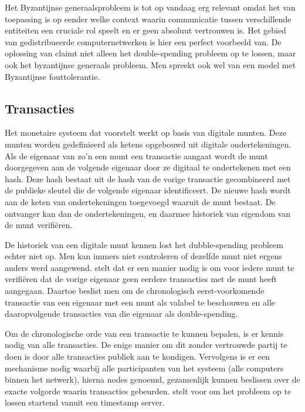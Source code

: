 			Het Byzantijnse generaalsprobleem is tot op vandaag erg relevant omdat het van toepassing is op eender welke context waarin communicatie tussen verschillende entiteiten een cruciale rol speelt en er geen absoluut vertrouwen is. Het gebied van gedistribueerde computernetwerken is hier een perfect voorbeeld van. De oplossing van \textcite{Nakamoto2008} claimt niet alleen het double-spending probleem op te lossen, maar ook het byzantijnse generaals probleem. Men spreekt ook wel van een model met Byzantijnse fouttolerantie.
			
	\subsection{Transacties}
	Het monetaire systeem dat \textcite{Nakamoto2008} voorstelt werkt op basis van digitale munten. Deze munten worden gedefinieerd als ketens opgebouwd uit digitale ondertekeningen. Als de eigenaar van zo’n een munt een transactie aangaat wordt de munt doorgegeven aan de volgende eigenaar door ze digitaal te ondertekenen met een hash. Deze hash bestaat uit de hash van de vorige transactie gecombineerd met de publieke sleutel die de volgende eigenaar identificeert. De nieuwe hash wordt aan de keten van ondertekeningen toegevoegd waaruit de munt bestaat. De ontvanger kan dan de ondertekeningen, en daarmee historiek van eigendom van de munt verifiëren. 
			
	De historiek van een digitale munt kennen lost het dubble-spending probleem echter niet op. Men kan immers niet controleren of dezelfde munt niet ergens anders werd aangewend. \textcite{Nakamoto2008} stelt dat er een manier nodig is om voor iedere munt te verifiëren dat de vorige eigenaar geen eerdere transacties met de munt heeft aangegaan. Daartoe beslist men om de chronologisch eerst-voorkomende transactie van een eigenaar met een munt als valabel te beschouwen en alle daaropvolgende transacties van die eigenaar als double-spending. 
			
	Om de chronologische orde van een transactie te kunnen bepalen, is er kennis nodig van alle transacties. De enige manier om dit zonder vertrouwde partij te doen is door alle transacties publiek aan te kondigen. Vervolgens is er een mechanisme nodig waarbij alle participanten van het systeem (alle computers binnen het netwerk), hierna nodes genoemd, gezamenlijk kunnen beslissen over de exacte volgorde waarin transacties gebeurden. \textcite{Nakamoto2008} stelt voor om het probleem op te lossen startend vanuit een timestamp server. 
			
